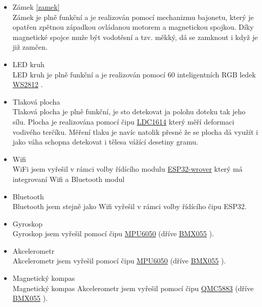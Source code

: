 \begin{itemize}
    \item Zámek \ref{zamek} \\ Zámek je plně funkční a je realizován pomocí mechanizmu bajonetu, který je opatřen zpětnou západkou ovládanou motorem a magnetickou spojkou. 
        Díky magnetické spojce muže být vodotěsní a tzv. měkký, dá se zamknout i když je již zamčen. 
    \item LED kruh \\ LED kruh je plně funkční a je realizován pomocí 60 inteligentních RGB ledek \href{https://cdn-shop.adafruit.com/datasheets/WS2812B.pdf}{WS2812} \parencite{WS2812}.
    \item Tlaková plocha \\ Tlaková plocha je plně funkční, je sto detekovat ja polohu doteku tak jeho sílu. Plocha je realizována pomocí čipu \href{https://www.ti.com/lit/ds/symlink/ldc1612.pdf?ts=1612018658531&ref_url=https%253A%252F%252Fwww.google.com%252F}{LDC1614} \parencite{LDC1614} který měří deformaci
        vodivého terčíku. Měření tlaku je navíc natolik přesné že se plocha dá využít i jako váha schopna detekovat i tělesa vážící desetiny gramu. %
    \item Wifi \\ WiFi jsem vyřešil v rámci volby řídícího modulu \href{https://www.espressif.com/sites/default/files/documentation/esp32-wrover-b_datasheet_en.pdf}{ESP32-wrover} \parencite{ESP32-WROVER-B} 
            který má integrovaní Wifi a Bluetooth modul
    \item Bluetooth \\ Bluetooth jsem stejně jako Wifi vyřešil v rámci volby řídícího čipu ESP32.
    \item Gyroskop \\ Gyroskop jsem vyřešil pomocí čipu \href{https://datasheet.lcsc.com/szlcsc/TDK-InvenSense-MPU-6050_C24112.pdf}{MPU6050} (dříve \href{https://datasheet.lcsc.com/szlcsc/Bosch-Sensortec-BMX055_C94022.pdf}{BMX055} \parencite{bmx055}).
    \item Akcelerometr \\ Akcelerometr jsem vyřešil pomocí čipu \href{https://datasheet.lcsc.com/szlcsc/TDK-InvenSense-MPU-6050_C24112.pdf}{MPU6050} (dříve \href{https://datasheet.lcsc.com/szlcsc/Bosch-Sensortec-BMX055_C94022.pdf}{BMX055} \parencite{bmx055}).
    \item Magnetický kompas \\ Magnetický kompas Akcelerometr jsem vyřešil pomocí čipu \href{https://datasheet.lcsc.com/szlcsc/QST-QMC5883L-TR_C192585.pdf}{QMC5883} \parencite{qmc5883} (dříve \href{https://datasheet.lcsc.com/szlcsc/Bosch-Sensortec-BMX055_C94022.pdf}{BMX055} \parencite{bmx055}).

\end{itemize}
